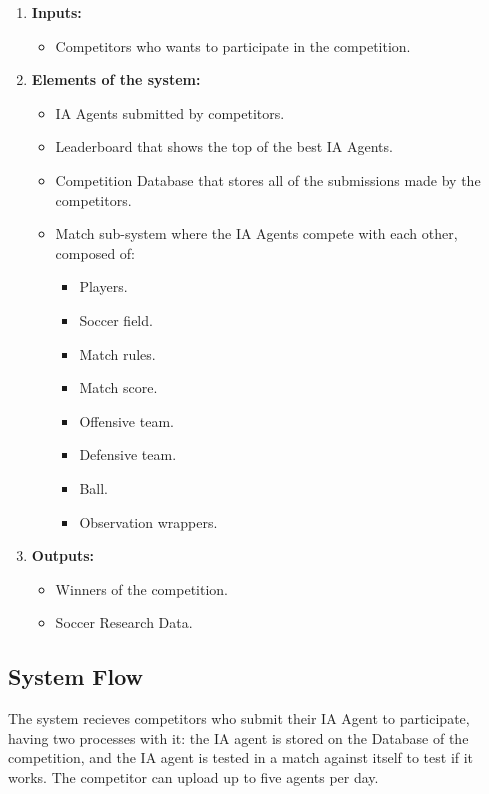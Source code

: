 \begin{enumerate}

    \item \textbf{Inputs:}
    \begin{itemize}
        \item Competitors who wants to participate in the competition.
    \end{itemize}

    \item \textbf{Elements of the system:}
    \begin{itemize}
        \item IA Agents submitted by competitors.
        \item Leaderboard that shows the top of the best IA Agents.
        \item Competition Database that stores all of the submissions made by the competitors.
        \item Match sub-system where the IA Agents compete with each other, composed of:
        \begin{itemize}
            \item Players.
            \item Soccer field.
            \item Match rules.
            \item Match score.
            \item Offensive team.
            \item Defensive team.
            \item Ball.
            \item Observation wrappers.
        \end{itemize}
    \end{itemize}

    \item \textbf{Outputs:}
    \begin{itemize}
        \item Winners of the competition.
        \item Soccer Research Data.
    \end{itemize}
\end{enumerate}

\subsection*{System Flow}

The system recieves competitors who submit their IA Agent to participate, having two processes with it: the IA agent is stored on the Database of the competition, and the IA agent is tested in a match against itself to test if it works. The competitor can upload up to five agents per day.

